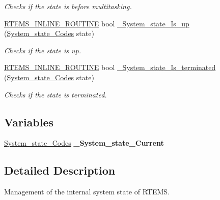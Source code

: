 \begin{DoxyCompactItemize}
\begin{DoxyCompactList}\small\item\em Checks if the state is before multitasking. \end{DoxyCompactList}\item 
\mbox{\hyperlink{group__RTEMSScoreBaseDefs_gac216239df231d5dbd15e3520b0b9313f}{R\+T\+E\+M\+S\+\_\+\+I\+N\+L\+I\+N\+E\+\_\+\+R\+O\+U\+T\+I\+NE}} bool \mbox{\hyperlink{group__RTEMSScoreSysState_gaa34964b3212ea72baf5ec0064f5d28df}{\+\_\+\+System\+\_\+state\+\_\+\+Is\+\_\+up}} (\mbox{\hyperlink{group__RTEMSScoreSysState_ga959824776c35a999ecd2720fde987d72}{System\+\_\+state\+\_\+\+Codes}} state)
\begin{DoxyCompactList}\small\item\em Checks if the state is up. \end{DoxyCompactList}\item 
\mbox{\hyperlink{group__RTEMSScoreBaseDefs_gac216239df231d5dbd15e3520b0b9313f}{R\+T\+E\+M\+S\+\_\+\+I\+N\+L\+I\+N\+E\+\_\+\+R\+O\+U\+T\+I\+NE}} bool \mbox{\hyperlink{group__RTEMSScoreSysState_gaf426f4f19104b5305427abc9060fd53e}{\+\_\+\+System\+\_\+state\+\_\+\+Is\+\_\+terminated}} (\mbox{\hyperlink{group__RTEMSScoreSysState_ga959824776c35a999ecd2720fde987d72}{System\+\_\+state\+\_\+\+Codes}} state)
\begin{DoxyCompactList}\small\item\em Checks if the state is terminated. \end{DoxyCompactList}\end{DoxyCompactItemize}
\subsection*{Variables}
\begin{DoxyCompactItemize}
\item 
\mbox{\label{group__RTEMSScoreSysState_ga2d8873c4e22acb4d5aac6b6259c66c0f}} 
\mbox{\hyperlink{group__RTEMSScoreSysState_ga959824776c35a999ecd2720fde987d72}{System\+\_\+state\+\_\+\+Codes}} {\bfseries \+\_\+\+System\+\_\+state\+\_\+\+Current}
\end{DoxyCompactItemize}


\subsection{Detailed Description}
Management of the internal system state of R\+T\+E\+MS. 



